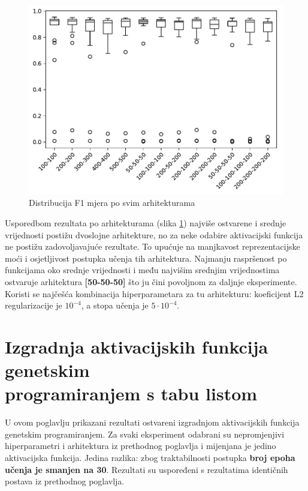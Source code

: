 \documentclass[times, utf8, numeric, diplomski]{fer}
\def\figref#1{(slika \ref{#1})}
\begin{document}
\begin{figure}[H]
\includegraphics[width=\textwidth]{greedy_9_arch_quality.pdf}
\centering
\caption{Distribucija F1 mjera po svim arhitekturama}
\label{fig:greedy_9_arch_quality}
\end{figure}

Usporedbom rezultata po arhitekturama \figref{fig:greedy_9_arch_quality} najviše ostvarene i srednje vrijednosti postižu dvoslojne arhitekture, no za neke odabire aktivacijski funkcija ne postižu zadovoljavajuće rezultate. To upućuje na manjkavost reprezentacijske moći i osjetljivost postupka učenja tih arhitektura. Najmanju raspršenost po funkcijama oko srednje vrijednosti i među najvišim srednjim vrijednostima ostvaruje arhitektura \textbf{[50-50-50]} što ju čini povoljnom za daljnje eksperimente. Koristi se najčešća kombinacija hiperparametara za tu arhitekturu: koeficijent L2 regularizacije je $10^{-4}$, a stopa učenja je $5\cdot 10^{-4}$.

\clearpage

\section{Izgradnja aktivacijskih funkcija genetskim \\ programiranjem s tabu listom}
U ovom poglavlju prikazani rezultati ostvareni izgradnjom aktivacijskih funkcija genetskim programiranjem. Za svaki eksperiment odabrani su nepromjenjivi hiperparametri i arhitektura iz prethodnog poglavlja i mijenjana je jedino aktivacijska funkcija. Jedina razlika: zbog traktabilnosti postupka \textbf{broj epoha učenja je smanjen na 30}. Rezultati su uspoređeni s rezultatima identičnih postava iz prethodnog poglavlja. 
\end{document}
